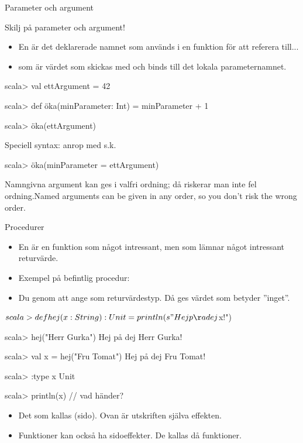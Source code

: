 \begin{Slide}{Parameter och argument}

Skilj på parameter och argument!
\begin{itemize}
\item En  är det deklarerade namnet som används  i en funktion för att referera till...

\item {} som är värdet som skickas med  och binds till det lokala parameternamnet.

\end{itemize}


\begin{REPLnonum}
scala> val ettArgument = 42

scala> def öka(minParameter: Int) = minParameter + 1

scala> öka(ettArgument)
\end{REPLnonum}


Speciell syntax: anrop med s.k. 
\begin{REPLnonum}
scala> öka(minParameter = ettArgument)
\end{REPLnonum}
{\SlideFontSmall \ifswedish Namngivna argument kan ges i valfri ordning; då riskerar man inte fel ordning.\else Named arguments can be given in any order, so you don't risk the wrong order.\fi}

\end{Slide}

\begin{Slide}{Procedurer}\SlideFontSmall
\begin{itemize}
\item En  är en funktion som  något intressant, men som  lämnar något intressant returvärde.
\item Exempel på befintlig procedur: 
\item Du  genom att ange \texttt{} som returvärdestyp. Då ges värdet \texttt{\Alert{()}} som betyder ''inget''.
\end{itemize}
\begin{REPLsmall}$%
scala> def hej(x: String): Unit = println(s"Hej på dej $x!")

scala> hej("Herr Gurka")
Hej på dej Herr Gurka!

scala> val x = hej("Fru Tomat")
Hej på dej Fru Tomat!

scala> :type x 
Unit

scala> println(x)    // vad händer?
\end{REPLsmall}
\begin{itemize}
\item Det som  kallas (sido). Ovan är utskriften själva effekten.
\item Funktioner kan också ha sidoeffekter. De kallas då  funktioner.
\end{itemize}
\end{Slide}


